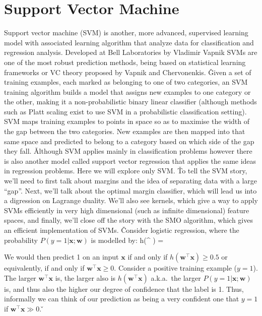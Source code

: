 \section{Support Vector Machine}

Support vector machine (SVM) is another, more advanced, supervised learning model with associated learning algorithm
that analyze data for classification and regression analysis. Developed at Bell Laboratories by Vladimir Vapnik SVMs
are one of the most robust prediction methods, being based on statistical learning frameworks or VC theory proposed
by Vapnik and Chervonenkis. \v

Given a set of training examples, each marked as belonging to one of two categories, an SVM training algorithm builds
a model that assigns new examples to one category or the other, making it a non-probabilistic binary linear
classifier (although methods such as Platt scaling exist to use SVM in a probabilistic classification setting). SVM
maps training examples to points in space so as to maximise the width of the gap between the two categories. New
examples are then mapped into that same space and predicted to belong to a category based on which side of the gap
they fall. \v

Although SVM applies mainly in classification problems however there is also another model called support vector
regression that applies the same ideas in regression problems. Here we will explore only SVM. \v

To tell the SVM story, we'll need to first talk about margins and the idea of separating data with a large ``gap''.
Next, we'll talk about the optimal margin classifier, which will lead us into a digression on Lagrange duality. We'll
also see kernels, which give a way to apply SVMs efficiently in very high dimensional (such as infinite dimensional)
feature spaces, and finally, we'll close off the story with the SMO algorithm, which gives an efficient
implementation of SVMs. \v

Consider logistic regression, where the probability $P(y = 1| \boldsymbol{x}; \boldsymbol{w})$ is modelled by:
\bse
h(^{\intercal} ) = 
\ese

We would then predict 1 on an input $\boldsymbol{x}$ if and only if $h \left(\boldsymbol{w}^{\intercal}
\boldsymbol{x}\right) \geq 0.5$ or equivalently, if and only if $\boldsymbol{w}^{\intercal} \boldsymbol{x} \geq 0$.
Consider a positive training example ($y = 1$). The larger $\boldsymbol{w}^{\intercal} \boldsymbol{x}$ is, the larger
also is $h\left(\boldsymbol{w}^{\intercal} \boldsymbol{x}\right)$ a.k.a.\ the larger $P(y = 1| \boldsymbol{x};
\boldsymbol{w})$ is, and thus also the higher our degree of confidence that the label is 1. Thus, informally we can
think of our prediction as being a very confident one that $y = 1$ if $\boldsymbol{w}^{\intercal} \boldsymbol{x} \gg 0$.
\v

